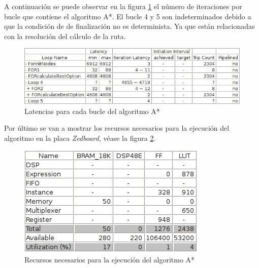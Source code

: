 A continuación se puede observar en la figura \ref{fig:loop} el número de iteraciones por bucle que contiene el algoritmo A*. El bucle 4 y 5 son indeterminados debido a que la condición de de finalización no es determinista. Ya que están relacionadas con la resolución del cálculo de la ruta.

\begin{figure}[htbp]
 \centering
    \includegraphics[width=1\textwidth]{./figures/loop.jpeg}
 \caption{Latencias para cada bucle del algoritmo A*}
 \label{fig:loop}
\end{figure}

Por último se van a mostrar los recursos necesarios para la ejecución del algoritmo en la placa \emph{Zedboard}, véase la figura \ref{fig:recursos}.

\begin{figure}[htbp]
 \centering
    \includegraphics[width=.7\textwidth]{./figures/recursos.jpeg}
 \caption{Recursos necesarios para la ejecución del algoritmo A*}
 \label{fig:recursos}
\end{figure}

